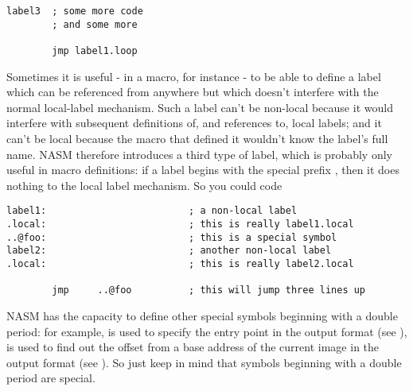 \begin{lstlisting}
label3  ; some more code
        ; and some more

        jmp label1.loop
\end{lstlisting}

Sometimes it is useful - in a macro, for instance - to be able to
define a label which can be referenced from anywhere but which
doesn't interfere with the normal local-label mechanism. Such a
label can't be non-local because it would interfere with subsequent
definitions of, and references to, local labels; and it can't be
local because the macro that defined it wouldn't know the label's
full name. NASM therefore introduces a third type of label, which is
probably only useful in macro definitions: if a label begins with
the special prefix , then it
does nothing to the local label mechanism. So you could code

\begin{lstlisting}
label1:                         ; a non-local label
.local:                         ; this is really label1.local
..@foo:                         ; this is a special symbol
label2:                         ; another non-local label
.local:                         ; this is really label2.local

        jmp     ..@foo          ; this will jump three lines up
\end{lstlisting}

NASM has the capacity to define other special symbols beginning with
a double period: for example,  is used to specify the
entry point in the  output format (see ),
 is used to find out the offset from a base address
of the current image in the  output format
(see ). So just keep in mind that symbols
beginning with a double period are special.
